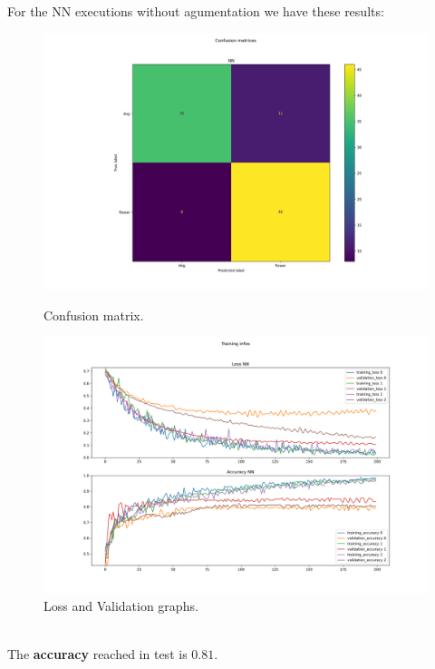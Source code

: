 \documentclass{report}
\def\weight{0.7}
\begin{document}
\pagebreak

For the NN executions without agumentation we have these results:
\begin{figure}[ht!]
  \centering
  \begin{minipage}[b]{\weight\linewidth}
    \includegraphics[width=\linewidth]{2.senza_augmentationNN/conf_mat.png}
    \caption{Confusion matrix.}
    \label{fig:image1}
  \end{minipage}
  \hspace{0.5cm}
  \begin{minipage}[b]{\weight\linewidth}
    \includegraphics[width=\linewidth]{2.senza_augmentationNN/training_infos.png}
    \caption{Loss and Validation graphs.}
    \label{fig:image2}
  \end{minipage}
\end{figure}\\
The \textbf{accuracy} reached in test is $0.81$.\\
\end{document}
